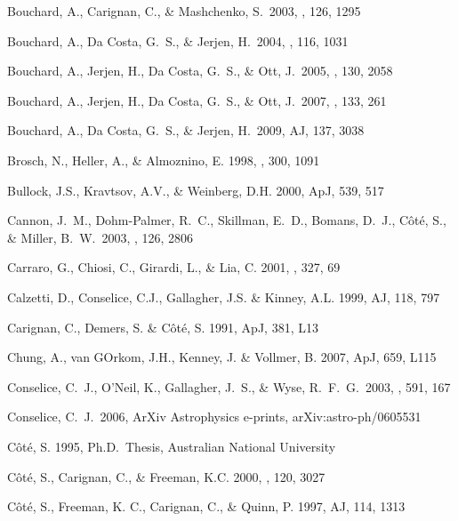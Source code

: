 \documentclass[preprint]{aastex}
\begin{document}
\begin{thebibliography}{}
Bouchard, A., Carignan, C., \& Mashchenko, S.\ 2003, \aj, 126, 1295 

Bouchard, A., Da Costa, G.~S., \& Jerjen, H.\ 2004, \pasp, 116, 1031 

Bouchard, A., Jerjen, H., Da Costa, G.~S., \& Ott, J.\ 2005, \aj, 130, 2058 

Bouchard, A., Jerjen, H., Da Costa, G.~S., \& Ott, J.\ 2007, \aj, 133, 261 

Bouchard, A., Da Costa, G.~S., \& Jerjen, H.\ 2009, AJ, 137, 3038

Brosch, N., Heller, A., \& Almoznino, E. 1998, \mnras , 300, 1091

Bullock, J.S., Kravtsov, A.V., \& Weinberg, D.H. 2000, ApJ, 539, 517

Cannon, J.~M., Dohm-Palmer, R.~C., Skillman, E.~D., Bomans, D.~J., 
C{\^o}t{\'e}, S., \& Miller, B.~W.\ 2003, \aj, 126, 2806 

Carraro, G., Chiosi, C., Girardi, L., \& Lia, C. 2001, \mnras, 327, 69 

Calzetti, D., Conselice, C.J., Gallagher, J.S. \& Kinney, A.L. 1999, AJ, 118, 797

Carignan, C., Demers, S. \& C\^ot\'e, S. 1991, ApJ, 381, L13

Chung, A., van GOrkom, J.H., Kenney, J. \& Vollmer, B. 2007, ApJ, 659, L115 

Conselice, C.~J., O'Neil, K., Gallagher, J.~S., \& Wyse, R.~F.~G.\ 2003, \apj, 591, 167 

Conselice, C.~J.\ 2006, ArXiv Astrophysics e-prints, arXiv:astro-ph/0605531 

C\^ot\'e, S. 1995, Ph.D.\ Thesis, Australian National University

C\^ot\'e, S., Carignan, C., \& Freeman, K.C. 2000, \aj , 120, 3027

C\^ot\'e, S., Freeman, K. C., Carignan, C., \& Quinn, P. 1997, AJ, 114, 1313


\end{thebibliography}
\end{document}
